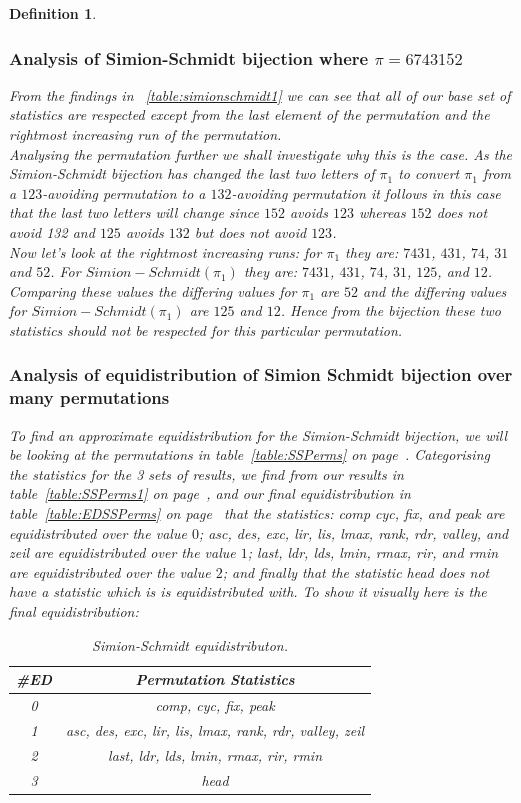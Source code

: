 \documentclass[12pt]{article}
\newtheorem{definition}{Definition}
\begin{document}
\begin{definition}
\subsubsection{Analysis of Simion-Schmidt bijection where $\pi = 6743152$}
From the findings in ~\ref{table:simionschmidt1} we can see that all of our base set of statistics are respected except from the last element of the permutation and the rightmost increasing run of the permutation.\\
Analysing the permutation further we shall investigate why this is the case. As the Simion-Schmidt bijection has changed the last two letters of $\pi_1$ to convert $\pi_1$ from a $123$-avoiding permutation to a $132$-avoiding permutation it follows in this case that the last two letters will change since $152$ avoids $123$ whereas $152$ does not avoid 132 and $125$ avoids $132$ but does not avoid $123$.\\
Now let's look at the rightmost increasing runs: for $\pi_1$ they are: $7431$, $431$, $74$, $31$ and $52$. For $Simion-Schmidt(\pi_1)$ they are:  $7431$, $431$, $74$, $31$, $125$, and $12$. Comparing these values the differing values for $\pi_1$ are $52$ and the differing values for $Simion-Schmidt(\pi_1)$ are $125$ and $12$. Hence from the bijection these two statistics should not be respected for this particular permutation. 
\subsubsection{Analysis of equidistribution of Simion Schmidt bijection over many permutations}
To find an approximate equidistribution for the Simion-Schmidt bijection, we will be looking at the permutations in table~\ref{table:SSPerms} on page~\pageref{table:SSPerms}. Categorising the statistics for the 3 sets of results, we find from our results in table~\ref{table:SSPerms1} on page~\pageref{table:SSPerms1}, and our final equidistribution in table~\ref{table:EDSSPerms} on page~\pageref{table:EDSSPerms} that the statistics: comp cyc, fix, and peak are equidistributed over the value $0$; asc, des, exc, lir, lis, lmax, rank, rdr, valley, and zeil are equidistributed over the value $1$; last, ldr, lds, lmin, rmax, rir, and rmin are equidistributed over the value $2$; and finally that the statistic head does not have a statistic which is is equidistributed with. To show it visually here is the final equidistribution:
\begin{table}[H]
\caption{Simion-Schmidt equidistributon.}
\begin{tabular}{c | c}
\hline\hline
\#ED & Permutation Statistics\\ [0.5ex]
\hline
0 & comp, cyc, fix, peak \\
\hline
1 & asc, des, exc, lir, lis, lmax, rank, rdr, valley, zeil  \\
\hline
2 & last, ldr, lds, lmin, rmax, rir, rmin \\
\hline
3 & head \\
\hline
\end{tabular}
\label{table:FinalEDSS}
\end{table}


\end{definition}
\end{document}
